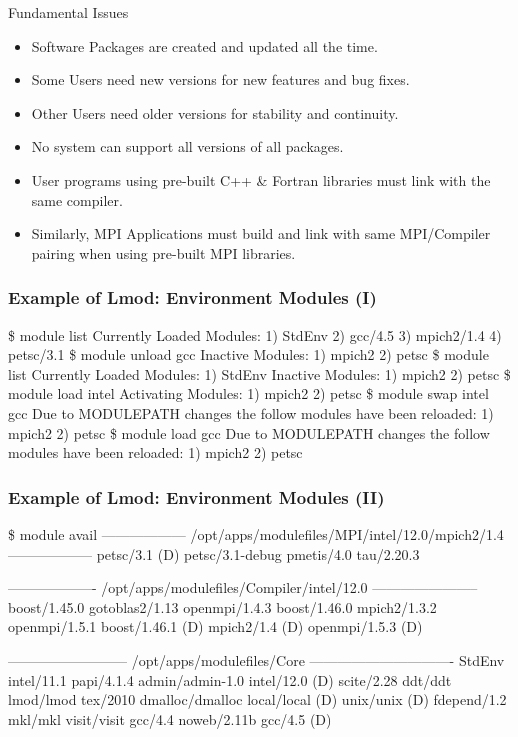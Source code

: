 \documentclass{beamer}
\begin{document}
\begin{frame}{Fundamental Issues}
  \begin{itemize}
    \item Software Packages are created and updated all the time.
    \item Some Users need new versions for new features and bug fixes.
    \item Other Users need older versions for stability and continuity.
    \item No system can support all versions of all packages.
    \item User programs using pre-built C++ \& Fortran libraries must link with the same compiler.
    \item Similarly, MPI Applications must build and link with same
      MPI/Compiler pairing when using pre-built MPI libraries.
  \end{itemize}
\end{frame}


\begin{frame}[fragile]
    \frametitle{Example of Lmod: Environment Modules (I)}
    {\tiny
\begin{semiverbatim}
{\color{blue}\$ module list}
Currently Loaded Modules:
  1) StdEnv  2) gcc/4.5  3) mpich2/1.4  4) petsc/3.1
{\color{blue}\$ module unload gcc}
Inactive Modules:
  1) mpich2  2) petsc
{\color{blue}\$ module list}
Currently Loaded Modules:
  1) StdEnv
Inactive Modules:
  1) mpich2  2) petsc
{\color{blue}\$ module load intel}
Activating Modules:
  1) mpich2  2) petsc
{\color{blue}\$ module swap intel gcc}
Due to MODULEPATH changes the follow modules have been reloaded:
  1) mpich2  2) petsc
{\color{blue}\$ module load gcc}
Due to MODULEPATH changes the follow modules have been reloaded:
  1) mpich2  2) petsc
\end{semiverbatim}
    }
\end{frame}

\begin{frame}[fragile]
    \frametitle{Example of Lmod: Environment Modules (II)}
    {\tiny
\begin{semiverbatim}
\$ {\color{blue} module avail}
------------------ /opt/apps/modulefiles/MPI/intel/12.0/mpich2/1.4 ------------------
  petsc/3.1 (D)    petsc/3.1-debug    pmetis/4.0    tau/2.20.3

------------------- /opt/apps/modulefiles/Compiler/intel/12.0 -----------------------
  boost/1.45.0        gotoblas2/1.13      openmpi/1.4.3
  boost/1.46.0        mpich2/1.3.2        openmpi/1.5.1
  boost/1.46.1 (D)    mpich2/1.4    (D)   openmpi/1.5.3   (D)

-------------------------- /opt/apps/modulefiles/Core -------------------------------
  StdEnv               intel/11.1         papi/4.1.4
  admin/admin-1.0      intel/12.0  (D)    scite/2.28
  ddt/ddt              lmod/lmod          tex/2010
  dmalloc/dmalloc      local/local (D)    unix/unix    (D)
  fdepend/1.2          mkl/mkl            visit/visit
  gcc/4.4              noweb/2.11b
  gcc/4.5        (D)
\end{semiverbatim}
    }
\end{frame}
\end{document}
